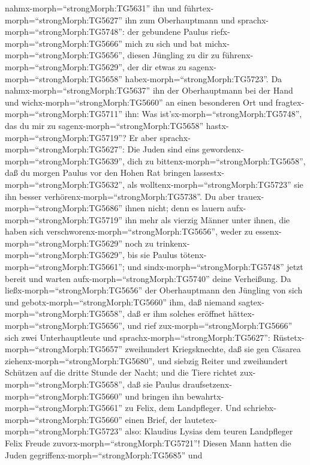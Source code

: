 nahmx-morph=``strongMorph:TG5631'' ihn und
führtex-morph=``strongMorph:TG5627'' ihn zum Oberhauptmann und
sprachx-morph=``strongMorph:TG5748'': der gebundene Paulus
riefx-morph=``strongMorph:TG5666'' mich zu sich und bat
michx-morph=``strongMorph:TG5656'', diesen Jüngling zu dir zu
führenx-morph=``strongMorph:TG5629'', der dir etwas zu
sagenx-morph=``strongMorph:TG5658'' habex-morph=``strongMorph:TG5723''.
 Da nahmx-morph=``strongMorph:TG5637'' ihn der
Oberhauptmann bei der Hand und wichx-morph=``strongMorph:TG5660'' an
einen besonderen Ort und fragtex-morph=``strongMorph:TG5711'' ihn: Was
ist'sx-morph=``strongMorph:TG5748'', das du mir zu
sagenx-morph=``strongMorph:TG5658'' hastx-morph=``strongMorph:TG5719''?
 Er aber sprachx-morph=``strongMorph:TG5627'': Die Juden
sind eins gewordenx-morph=``strongMorph:TG5639'', dich zu
bittenx-morph=``strongMorph:TG5658'', daß du morgen Paulus vor den Hohen
Rat bringen lassestx-morph=``strongMorph:TG5632'', als
wolltenx-morph=``strongMorph:TG5723'' sie ihn besser
verhörenx-morph=``strongMorph:TG5738''.  Du aber
trauex-morph=``strongMorph:TG5686'' ihnen nicht; denn es lauern
aufx-morph=``strongMorph:TG5719'' ihn mehr als vierzig Männer unter
ihnen, die haben sich verschworenx-morph=``strongMorph:TG5656'', weder
zu essenx-morph=``strongMorph:TG5629'' noch zu
trinkenx-morph=``strongMorph:TG5629'', bis sie Paulus
tötenx-morph=``strongMorph:TG5661''; und
sindx-morph=``strongMorph:TG5748'' jetzt bereit und warten
aufx-morph=``strongMorph:TG5740'' deine Verheißung.  Da
ließx-morph=``strongMorph:TG5656'' der Oberhauptmann den Jüngling von
sich und gebotx-morph=``strongMorph:TG5660'' ihm, daß niemand
sagtex-morph=``strongMorph:TG5658'', daß er ihm solches eröffnet
hättex-morph=``strongMorph:TG5656'',  und rief
zux-morph=``strongMorph:TG5666'' sich zwei Unterhauptleute und
sprachx-morph=``strongMorph:TG5627'':
Rüstetx-morph=``strongMorph:TG5657'' zweihundert Kriegsknechte, daß sie
gen Cäsarea ziehenx-morph=``strongMorph:TG5680'', und siebzig Reiter und
zweihundert Schützen auf die dritte Stunde der Nacht;  und
die Tiere richtet zux-morph=``strongMorph:TG5658'', daß sie Paulus
draufsetzenx-morph=``strongMorph:TG5660'' und bringen ihn
bewahrtx-morph=``strongMorph:TG5661'' zu Felix, dem Landpfleger.
 Und schriebx-morph=``strongMorph:TG5660'' einen Brief, der
lautetex-morph=``strongMorph:TG5723'' also:  Klaudius
Lysias dem teuren Landpfleger Felix Freude
zuvorx-morph=``strongMorph:TG5721''!  Diesen Mann hatten
die Juden gegriffenx-morph=``strongMorph:TG5685'' und
